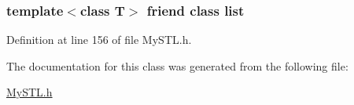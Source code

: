 \subsubsection[{list}]{\setlength{\rightskip}{0pt plus 5cm}template$<$class T$>$ friend class {\bf list}}\label{classlist_1_1const__iterator_a39e8296e3b93358d0af90000b5d9113c}


Definition at line 156 of file MySTL.h.



The documentation for this class was generated from the following file:\begin{DoxyCompactItemize}
\item 
\hyperlink{MySTL_8h}{MySTL.h}\end{DoxyCompactItemize}
